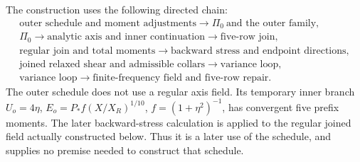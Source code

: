 \documentclass[10pt,a4paper]{article}
\begin{document}
The construction uses the following directed chain:
\[
\begin{gathered}
\text{outer schedule and moment adjustments}
\longrightarrow \Pi_0\ \text{and the outer family},\\
\Pi_0\longrightarrow\text{analytic axis and inner continuation}
\longrightarrow\text{five-row join},\\
\text{regular join and total moments}
\longrightarrow\text{backward stress and endpoint directions},\\
\text{joined relaxed shear and admissible collars}
\longrightarrow\text{variance loop},\\
\text{variance loop}\longrightarrow\text{finite-frequency field and five-row repair}.
\end{gathered}                                                    \tag{PA.2}
\]
The outer schedule does not use a regular axis field. Its temporary inner branch
$U_o=4\eta$, $E_o=P_*f(X/X_R)^{1/10}$, $f=(1+\eta^2)^{-1}$,
has convergent five prefix moments. The later backward-stress calculation is
applied to the regular joined field actually constructed below. Thus it is a
later use of the schedule, and supplies no premise needed to construct that schedule.
\end{document}
